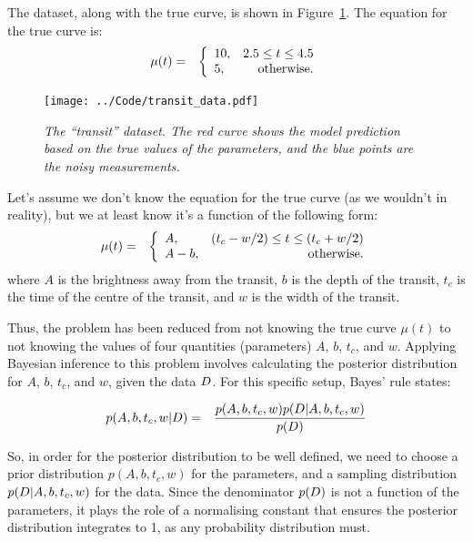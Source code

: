 The dataset, along with the true curve, is shown in 
Figure~\ref{fig:transit_data}. The equation for the true curve is:
\begin{eqnarray*}
\mu(t) &=& \left\{
\begin{array}{lr}
10, & 2.5 \leq t \leq 4.5\\
5,  & \textnormal{otherwise}.
\end{array}
\right.
\end{eqnarray*}

\begin{figure}
\begin{center}
\texttt{[image: ../Code/transit\_data.pdf]}
\caption{\it The ``transit'' dataset. The red curve shows the model prediction
based on the true values of the parameters, and the blue points are the
noisy measurements.\label{fig:transit_data}}
\end{center}
\end{figure}

Let's assume we don't know the equation for the true curve (as we wouldn't in
reality),
but we at least know it's a function of the following form:
\begin{eqnarray*}
\mu(t) &=& \left\{
\begin{array}{lr}
A, & (t_c - w/2) \leq t \leq (t_c + w/2)\\
A-b,  & \textnormal{otherwise}.
\end{array}
\right.
\end{eqnarray*}
where $A$ is the brightness away from the transit, $b$ is the depth of the
transit, $t_c$ is the time of the centre of the transit, and $w$ is the width
of the transit.

Thus, the problem has been reduced from not knowing the true curve $\mu(t)$
to not knowing the values of four quantities (parameters)
$A$, $b$, $t_c$, and $w$. Applying Bayesian inference to this problem
involves calculating the posterior distribution for $A$, $b$, $t_c$, and $w$,
given the data $D$. For this specific setup, Bayes' rule states:

\begin{eqnarray}
p(A, b, t_c, w | D) &=& \frac{p(A, b, t_c, w)p(D | A, b, t_c, w)}
{p(D)}
\end{eqnarray}

So, in order for the posterior distribution to be well defined, we need to
choose a prior distribution $p(A, b, t_c, w)$ for the parameters, and a
sampling distribution $p(D | A, b, t_c, w)$ for the data. Since the denominator
$p(D)$ is not a function of the parameters, it plays the role of a normalising
constant that ensures the posterior distribution integrates to 1, as any
probability distribution must.

